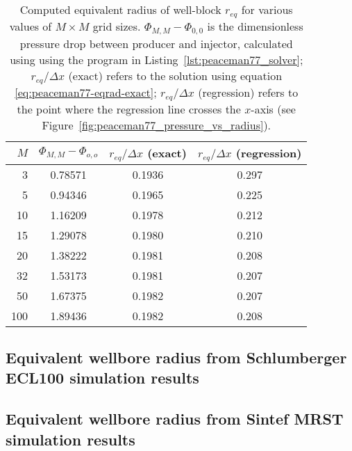 \begin{table}
    \centering
    \caption{Computed equivalent radius of well-block $r_{eq}$ for various values of $M\times M$ grid sizes. $\Phi_{M,M} - \Phi_{0,0}$ is the dimensionless pressure drop between producer and injector, calculated using using the program in Listing~\ref{lst:peaceman77_solver}; $r_{eq}/\Delta x$ (exact) refers to the solution using equation \eqref{eq:peaceman77-eqrad-exact}; $r_{eq} / \Delta x$ (regression) refers to the point where the regression line crosses the $x$-axis (see Figure~\ref{fig:peaceman77_pressure_vs_radius}).}
    \begin{tabular}{rccc}
        \toprule
        $M$ & $\Phi_{M,M} - \Phi_{o,o}$ & $r_{eq}/\Delta x$ (exact) & $r_{eq} / \Delta x$ (regression)\\
        \midrule
        3   & 0.78571 & 0.1936 & 0.297 \\
        5   & 0.94346 & 0.1965 & 0.225 \\
        10  & 1.16209 & 0.1978 & 0.212 \\
        15  & 1.29078 & 0.1980 & 0.210 \\
        20  & 1.38222 & 0.1981 & 0.208 \\
        32  & 1.53173 & 0.1981 & 0.207 \\
        50  & 1.67375 & 0.1982 & 0.207 \\
        100 & 1.89436 & 0.1982 & 0.208 \\
        \bottomrule
    \end{tabular}
    \label{tbl:peaceman-results}
\end{table}


\subsection{Equivalent wellbore radius from Schlumberger ECL100 simulation results} %
\label{sub:equivalent_wellbore_radius_from_schlumberger_ecl100_simulation_results}


\subsection{Equivalent wellbore radius from Sintef MRST simulation results} %
\label{sub:equivalent_wellbore_radius_from_sintef_mrst_simulation_results}



